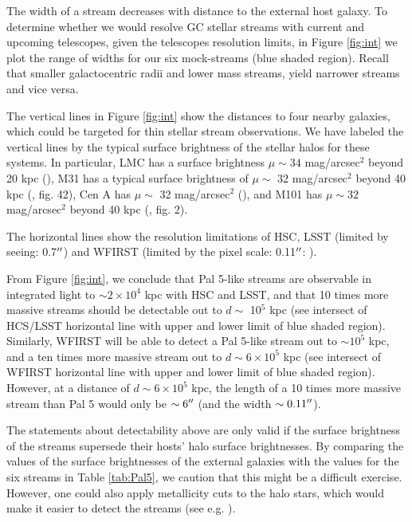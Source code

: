 \documentclass[twocolumn]{aastex62}
\begin{document}
The width of a stream decreases with distance to the external host galaxy. To determine whether we would resolve GC stellar streams with current and upcoming telescopes, given the telescopes resolution limits, in Figure \ref{fig:int} we plot the range of widths for our six mock-streams (blue shaded region). Recall that smaller galactocentric radii and lower mass streams, yield narrower streams and vice versa. %

The vertical lines in Figure \ref{fig:int} show the distances to four nearby galaxies, which could be targeted for thin stellar stream observations. We have labeled the vertical lines by the typical surface brightness of the stellar halos for these systems. In particular, LMC has a surface brightness $\mu \sim 34$ mag/arcsec$^2$ beyond 20 kpc (\citealt{nidever18}), M31 has a typical surface brightness of  $\mu \sim$ 32 mag/arcsec$^2$ beyond 40 kpc (\citealt{ibata07}, fig. 42), Cen A has  $\mu \sim $ 32 mag/arcsec$^2$ (\citealt{crno16}), and M101 has  $\mu \sim 32 $ mag/arcsec$^2$ beyond 40 kpc (\citealt{dokkum14}, fig. 2).

The horizontal lines show the resolution limitations of HSC, LSST (limited by seeing: 0.7$\mbox{$^{\prime\prime}$}$) and WFIRST (limited by the pixel scale: 0.11$\mbox{$^{\prime\prime}$}$: \citealt{spergel13}).

From Figure \ref{fig:int}, we conclude that Pal 5-like streams are observable in integrated light to $\sim 2\times 10^4$ kpc with HSC and LSST, and that 10 times more massive streams should be detectable out to $ d \sim$ 10$^5$ kpc (see intersect of HCS/LSST horizontal line with upper and lower limit of blue shaded region). Similarly, WFIRST will be able to detect a Pal 5-like stream out to $\sim 10^5$ kpc, and a ten times more massive stream out to $d \sim 6 \times 10^5$ kpc (see intersect of WFIRST horizontal line with upper and lower limit of blue shaded region). However, at a distance of $d \sim 6 \times 10^5$ kpc, the length of a 10 times more massive stream than Pal 5 would only be $\sim 6 \mbox{$^{\prime\prime}$}$ (and the width $\sim 0.11\mbox{$^{\prime\prime}$}$). 

The statements about detectability above are only valid if the surface brightness of the streams supersede their hosts' halo surface brightnesses. By comparing the values of the surface brightnesses of the external galaxies with the values for the six streams in Table \ref{tab:Pal5}, we caution that this might be a difficult exercise. However, one could also apply metallicity cuts to the halo stars, which would make it easier to detect the streams (see e.g. \citealt{ibata14}).
\end{document}
